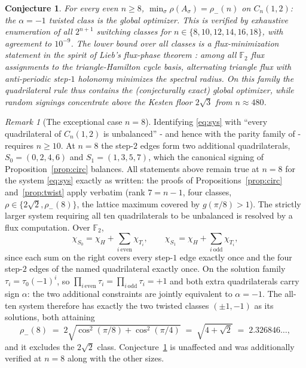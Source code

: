 \documentclass[11pt]{article}
\newtheorem{conjecture}[lemma]{Conjecture}
\theoremstyle{remark}
\newtheorem{remark}[lemma]{Remark}
\newcommand{\F}{\mathbb{F}}
\newcommand{\rhomax}{\rho}
\begin{document}
\begin{conjecture}\label{conj:circ}
For every even $n\ge8$,
$\min_\sigma\rhomax(A_\sigma)=\rho_-(n)$ on $C_n(1,2)$: the $\alpha=-1$
twisted class is the global optimizer. This is verified by exhaustive
enumeration of all $2^{n+1}$ switching classes for
$n\in\{8,10,12,14,16,18\}$, with agreement to $10^{-9}$. The lower
bound over all classes is a flux-minimization statement in the spirit of
Lieb's flux-phase theorem \cite{lieb94}: among all $\F_2$ flux
assignments to the triangle-Hamilton cycle basis, alternating triangle
flux with anti-periodic step-$1$ holonomy minimizes the spectral radius.
On this family the quadrilateral rule thus contains the (conjecturally
exact) global optimizer, while random signings concentrate \emph{above}
the Kesten floor $2\sqrt3$ from $n\approx480$.
\end{conjecture}

\begin{remark}[The exceptional case $n=8$]\label{rem:n8}
Identifying \eqref{eq:sys} with ``every quadrilateral of $C_n(1,2)$ is
unbalanced'' - and hence with the parity family of \cite{companionA}
- requires $n\ge10$. At $n=8$ the step-$2$ edges form two additional
quadrilaterals, $S_0=(0,2,4,6)$ and $S_1=(1,3,5,7)$, which the
canonical signing of Proposition~\ref{prop:circ} balances. All
statements above remain true at $n=8$ for the system \eqref{eq:sys}
exactly as written: the proofs of Propositions~\ref{prop:circ}
and~\ref{prop:twist} apply verbatim (rank $7=n-1$, four classes,
$\rho\in\{2\sqrt2,\rho_-(8)\}$, the lattice maximum covered by
$g(\pi/8)>1$). The strictly larger system requiring all ten
quadrilaterals to be unbalanced is resolved by a flux computation.
Over $\F_2$,
\[
\chi_{S_0}=\chi_H+\!\!\sum_{i\ \mathrm{even}}\!\chi_{T_i},\qquad
\chi_{S_1}=\chi_H+\!\!\sum_{i\ \mathrm{odd}}\!\chi_{T_i},
\]
since each sum on the right covers every step-$1$ edge exactly once
and the four step-$2$ edges of the named quadrilateral exactly once.
On the solution family $\tau_i=\tau_0(-1)^i$, so
$\prod_{i\,\mathrm{even}}\tau_i=\prod_{i\,\mathrm{odd}}\tau_i=+1$ and
both extra quadrilaterals carry sign $\alpha$: the two additional
constraints are jointly equivalent to $\alpha=-1$. The all-ten system
therefore has exactly the two twisted classes $(\pm1,-1)$ as its
solutions, both attaining
\[
\rho_-(8)\;=\;2\sqrt{\cos^2(\pi/8)+\cos^2(\pi/4)}\;=\;\sqrt{4+\sqrt2}
\;=\;2.326846\ldots,
\]
and it excludes the $2\sqrt2$ class. Conjecture~\ref{conj:circ} is
unaffected and was additionally verified at $n=8$ along with the other
sizes.
\end{remark}
\end{document}
